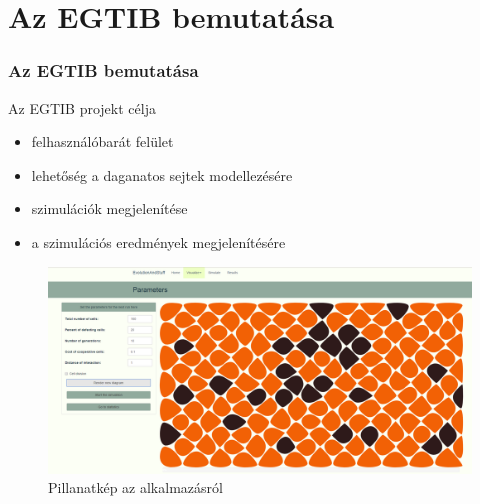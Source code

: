 \section{Az EGTIB bemutatása}
\begin{frame}
	\frametitle{Az EGTIB bemutatása}
	\begin{block}{Az EGTIB projekt célja}
		\begin{itemize}
			\item felhasználóbarát felület
			\item lehetőség a daganatos sejtek modellezésére 
			\item szimulációk megjelenítése
			\pause
			\item a szimulációs eredmények megjelenítésére
		\end{itemize}
	\end{block}

	\begin{figure}[ht!]
		\centering
		\includegraphics[width=0.6\linewidth]{images/voronoi_page.png}
		\caption{Pillanatkép az alkalmazásról}
		\label{fig:SimulateWithDiagram}
	\end{figure}
\end{frame}

